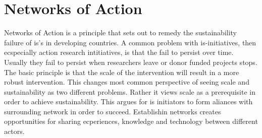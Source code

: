 \section{Networks of Action}
Networks of Action is a principle that sets out to remedy the sustainability failure of \gls{is}'s in developing countries. 
A common problem with \gls{is}-initiatives, then ecspecially action research intitiatives, is that the fail to persist over time.
Usually they fail to persist when researchers leave or donor funded projects stops. 
The basic principle is that the scale of the intervention will result in a more robust intervention. 
This changes most common perspective of seeing scale and sustainability as two different problems. 
Rather it views scale as a prerequisite in order to achieve sustainability.
This argues for \gls{is} initiators to form aliances with surrounding network in order to succeed. 
Establishin networks creates opportunities for sharing ecperiences, knowledge  and technology between different actors. 
